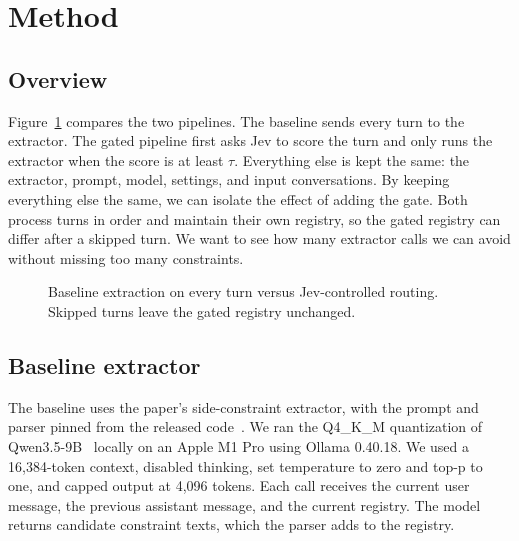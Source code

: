 \section{Method}
\subsection{Overview}
Figure~\ref{fig:pipeline} compares the two pipelines. The baseline sends every turn to the extractor. The gated pipeline first asks Jev to score the turn and only runs the extractor when the score is at least $\tau$. Everything else is kept the same: the extractor, prompt, model, settings, and input conversations. By keeping everything else the same, we can isolate the effect of adding the gate. Both process turns in order and maintain their own registry, so the gated registry can differ after a skipped turn. We want to see how many extractor calls we can avoid without missing too many constraints.

\begin{figure}[t]
\centering
{}
\caption{Baseline extraction on every turn versus Jev-controlled routing. Skipped turns leave the gated registry unchanged.}
\label{fig:pipeline}
\end{figure}

\subsection{Baseline extractor}
The baseline uses the paper's side-constraint extractor, with the prompt and parser pinned from the released code~\cite{compactionintegrity}. We ran the Q4\_K\_M quantization of Qwen3.5-9B~\cite{qwen35} locally on an Apple M1 Pro using Ollama 0.40.18. We used a 16,384-token context, disabled thinking, set temperature to zero and top-p to one, and capped output at 4,096 tokens. Each call receives the current user message, the previous assistant message, and the current registry. The model returns candidate constraint texts, which the parser adds to the registry.

